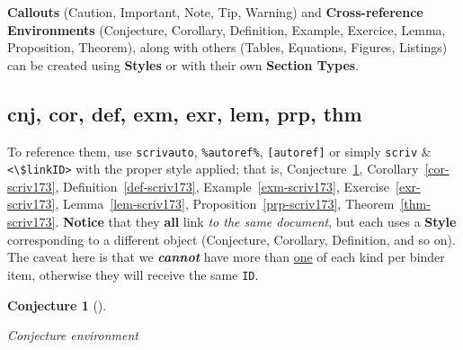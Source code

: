 \documentclass[
  12pt,
  a4paper,
  numbers=noenddot,
  titlepage,
  toclink=all,
  toc=bibliography]{scrbook}
\theoremstyle{plain}
\theoremstyle{definition}
\theoremstyle{definition}
\theoremstyle{definition}
\theoremstyle{plain}
\newtheorem{conjecture}{Conjecture}[section]
\theoremstyle{plain}
\theoremstyle{plain}
\theoremstyle{plain}
\theoremstyle{remark}
\begin{document}
\begin{tcolorbox}[enhanced jigsaw, colbacktitle=quarto-callout-tip-color!10!white, leftrule=.75mm, breakable, bottomrule=.15mm, coltitle=black, colback=white, rightrule=.15mm, left=2mm, opacitybacktitle=0.6, opacityback=0, toptitle=1mm, titlerule=0mm, title=\textcolor{quarto-callout-tip-color}{\faLightbulb}\hspace{0.5em}{Tip}, arc=.35mm, colframe=quarto-callout-tip-color-frame, toprule=.15mm, bottomtitle=1mm]

\textbf{Callouts} (Caution, Important, Note, Tip, Warning) and
\textbf{Cross-reference Environments} (Conjecture, Corollary,
Definition, Example, Exercice, Lemma, Proposition, Theorem), along with
others (Tables, Equations, Figures, Listings) can be created using
\textbf{Styles} or with their own \textbf{Section Types}.

\end{tcolorbox}

\hypertarget{sec-scriv173}{%
\subsection{cnj, cor, def, exm, exr, lem, prp, thm}\label{sec-scriv173}}

\protect\hypertarget{scriv173}{}{}

To reference them, use \texttt{scrivautο}, \texttt{\%autοref\%},
\texttt{{[}autοref{]}} or simply \texttt{scriv} \&
\texttt{\textless{}\textbackslash{}\$linkID\textgreater{}} with the
proper style applied; that is,
\protect\hypertarget{cite_37}{}{\label{cite_37}Conjecture~\ref{cnj-scriv173}},
\protect\hypertarget{cite_38}{}{\label{cite_38}Corollary~\ref{cor-scriv173}},
\protect\hypertarget{cite_39}{}{\label{cite_39}Definition~\ref{def-scriv173}},
\protect\hypertarget{cite_40}{}{\label{cite_40}Example~\ref{exm-scriv173}},
\protect\hypertarget{cite_41}{}{\label{cite_41}Exercise~\ref{exr-scriv173}},
\protect\hypertarget{cite_42}{}{\label{cite_42}Lemma~\ref{lem-scriv173}},
\protect\hypertarget{cite_43}{}{\label{cite_43}Proposition~\ref{prp-scriv173}},
\protect\hypertarget{cite_44}{}{\label{cite_44}Theorem~\ref{thm-scriv173}}.
\textbf{Notice} that they \textbf{all} link \emph{to the same document},
but each uses a \textbf{Style} corresponding to a different object
(Conjecture, Corollary, Definition, and so on). The caveat here is that
we \textbf{\emph{cannot}} have more than \ul{one} of each kind per
binder item, otherwise they will receive the same \texttt{ID}.

\begin{conjecture}[]\protect\hypertarget{cnj-scriv173}{}\label{cnj-scriv173}

Conjecture environment

\end{conjecture}
\end{document}
